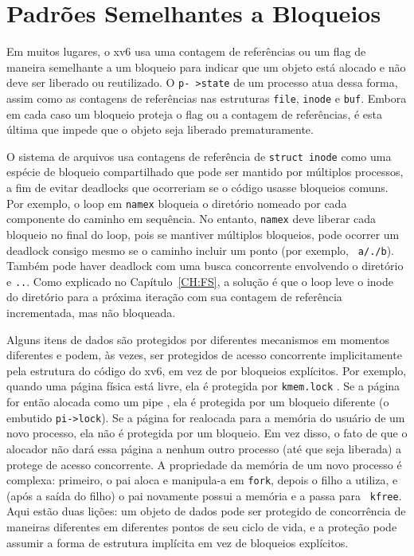 \section{Padrões Semelhantes a Bloqueios}

Em muitos lugares, o xv6 usa uma contagem de referências ou um flag de maneira semelhante a um bloqueio para indicar que um objeto está alocado e não deve ser liberado ou reutilizado. O {\tt p-
>state} de um processo atua dessa forma, assim como as contagens de referências nas estruturas {\tt file}, {\tt inode} e {\tt buf}. Embora em cada caso um bloqueio proteja o flag ou a contagem de 
referências, é esta última que impede que o objeto seja liberado prematuramente.

O sistema de arquivos usa contagens de referência de {\tt struct inode} como uma espécie de bloqueio compartilhado que pode ser mantido por múltiplos processos, a fim de evitar deadlocks que 
ocorreriam se o código usasse bloqueios comuns. Por exemplo, o loop em {\tt namex}  bloqueia o diretório nomeado por cada componente do caminho em sequência. No 
entanto, {\tt namex} deve liberar cada bloqueio no final do loop, pois se mantiver múltiplos bloqueios, pode ocorrer um deadlock consigo mesmo se o caminho incluir um ponto (por exemplo, {\tt 
a/./b}). Também pode haver deadlock com uma busca concorrente envolvendo o diretório e {\tt ..}. Como explicado no Capítulo~\ref{CH:FS}, a solução é que o loop leve o inode do diretório para a 
próxima iteração com sua contagem de referência incrementada, mas não bloqueada.

Alguns itens de dados são protegidos por diferentes mecanismos em momentos diferentes e podem, às vezes, ser protegidos de acesso concorrente implicitamente pela estrutura do código do xv6, em vez 
de por bloqueios explícitos. Por exemplo, quando uma página física está livre, ela é protegida por \texttt{kmem.lock} . Se a página for então alocada como um 
pipe , ela é protegida por um bloqueio diferente (o embutido \lstinline{pi->lock}). Se a página for realocada para a memória do usuário de um novo processo, ela 
não é protegida por um bloqueio. Em vez disso, o fato de que o alocador não dará essa página a nenhum outro processo (até que seja liberada) a protege de acesso concorrente. A propriedade da 
memória de um novo processo é complexa: primeiro, o pai aloca e manipula-a em {\tt fork}, depois o filho a utiliza, e (após a saída do filho) o pai novamente possui a memória e a passa para {\tt 
kfree}. Aqui estão duas lições: um objeto de dados pode ser protegido de concorrência de maneiras diferentes em diferentes pontos de seu ciclo de vida, e a proteção pode assumir a forma de 
estrutura implícita em vez de bloqueios explícitos.

